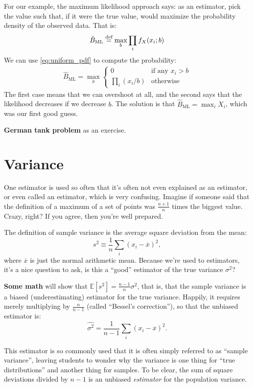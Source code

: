 For our example, the maximum likelihood approach says: as an estimator, pick
the value such that, if it were the true value, would maximize the probability
density of the observed data. That is:
\begin{equation}
\hat{B}_\text{ML} \stackrel{\text{def}}{=} \max_b \prod_i f_X(x_i; b)
\end{equation}
We can use \eqref{eq:uniform_pdf} to compute the probability:
\begin{align*}
\hat{B}_\text{ML} = \max_b \begin{cases}
0 &\text{if any $x_i > b$} \\
\prod_i (x_i/b) &\text{otherwise}
\end{cases}
\end{align*}
The first case means that we can overshoot at all, and the second says that
the likelihood decreases if we decrease $b$. The solution is that
$\hat{B}_\text{ML} = \max_i X_i$, which was our first good guess.

\textbf{German tank problem} as an exercise.

\section{Variance}\label{variance}

One estimator is used so often that it's often not even explained as an
estimator, or even called an estimator, which is very confusing. Imagine
if someone said that the definition of a maximum of a set of points was
\(\tfrac{n+1}{n}\) times the biggest value. Crazy, right? If you agree,
then you're well prepared.

The definition of sample variance is the average square deviation from
the mean: \[
s^2 \equiv \frac{1}{n} \sum_i (x_i - \overline{x})^2,
\] where \(\overline{x}\) is just the normal arithmetic mean. Because
we're used to estimators, it's a nice question to ask, is this a
``good'' estimator of the true variance \(\sigma^2\)?

\textbf{Some math} will show that
\(\mathbb{E}[s^2] = \tfrac{n-1}{n} \sigma^2\), that is, that the sample
variance is a biased (underestimating) estimator for the true variance.
Happily, it requires merely multiplying by \(\tfrac{n}{n-1}\) (called
``Bessel's correction''), so that the unbiased estimator is: \[
\hat{\sigma^2} = \frac{1}{n-1} \sum_i (x_i - \overline{x})^2.
\]

This estimator is so commonly used that it is often simply referred to
as ``sample variance'', leaving students to wonder why the variance is
one thing for ``true distributions'' and another thing for samples. To
be clear, the sum of square deviations divided by \(n-1\) is an unbiased
\emph{estimator} for the population variance.

